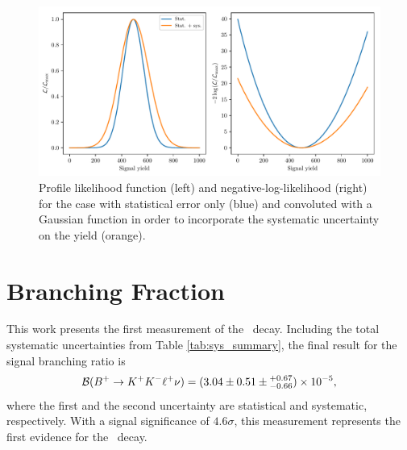 \begin{figure}[H]
	\centering
	\captionsetup{width=0.8\linewidth}
	\includegraphics[width=\linewidth]{fig/significance}
	\caption{Profile likelihood function (left) and negative-log-likelihood (right) for the case with statistical error only (blue) and convoluted with a Gaussian function in order to incorporate the systematic uncertainty on the yield (orange).}
	\label{fig:significance}
\end{figure}


\section{Branching Fraction}

This work presents the first measurement of the \decayb~decay. Including the total systematic uncertainties from Table \ref{tab:sys_summary}, the final result for the signal branching ratio is
\begin{equation}
\mathcal{B}(B^+ \to K^+ K^- \ell^+ \nu) = (3.04 \pm 0.51 \pm {}^{+0.67}_{-0.66})\times 10^{-5},
\end{equation}
where the first and the second uncertainty are statistical and systematic, respectively. With a signal significance of $4.6\sigma$, this measurement represents the first evidence for the \decayb~decay.

